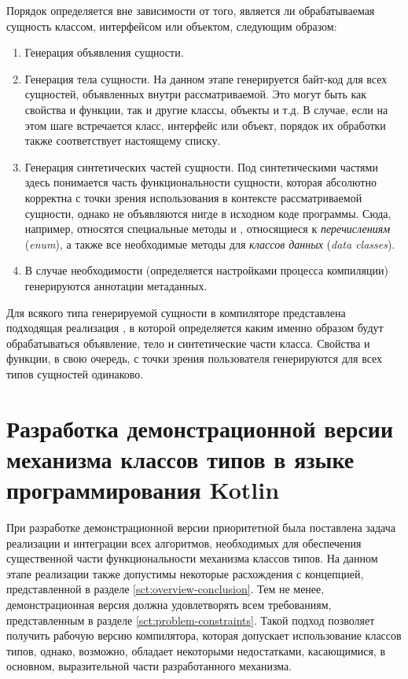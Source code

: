 Порядок определяется вне зависимости от того, является ли обрабатываемая сущность классом, интерфейсом или объектом, следующим образом:
\begin{enumerate}
    \item Генерация объявления сущности.
    \item Генерация тела сущности. На данном этапе генерируется байт-код для всех сущностей, объявленных внутри рассматриваемой. Это могут быть как свойства и функции, так и другие классы, объекты и т.д. В случае, если на этом шаге встречается класс, интерфейс или объект, порядок их обработки также соответствует настоящему списку. 
    \item Генерация синтетических частей сущности. Под синтетическими частями здесь понимается часть функциональности сущности, которая абсолютно корректна с точки зрения использования в контексте рассматриваемой сущности, однако не объявляются нигде в исходном коде программы. Сюда, например, относятся специальные методы  и , относящиеся к \emph{перечислениям} (\emph{enum}), а также все необходимые методы для \emph{классов данных} (\emph{data classes}).  
    \item В случае необходимости (определяется настройками процесса компиляции) генерируются аннотации метаданных.
\end{enumerate}
Для всякого типа генерируемой сущности в компиляторе представлена подходящая реализация , в которой определяется каким именно образом будут обрабатываться объявление, тело и синтетические части класса. Свойства и функции, в свою очередь, с точки зрения пользователя  генерируются для всех типов сущностей одинаково.

\section{Разработка демонстрационной версии механизма классов типов в языке программирования Kotlin}

При разработке демонстрационной версии приоритетной была поставлена задача реализации и интеграции всех алгоритмов, необходимых для обеспечения существенной части функциональности механизма классов типов. На данном этапе реализации также допустимы некоторые расхождения с концепцией, представленной в разделе \ref{sct:overview-conclusion}. Тем не менее, демонстрационная версия должна удовлетворять всем требованиям, представленным в разделе \ref{sct:problem-constraints}. Такой подход позволяет получить рабочую версию компилятора, которая допускает использование классов типов, однако, возможно, обладает некоторыми недостатками, касающимися, в основном, выразительной части разработанного механизма. 

